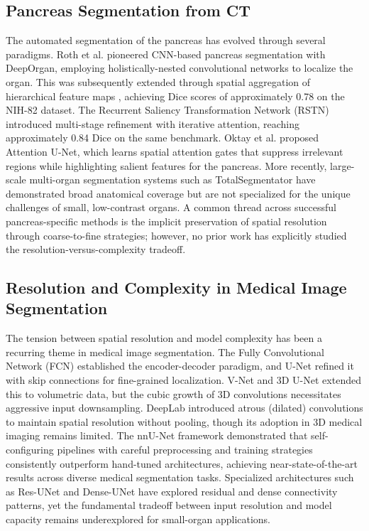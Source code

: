 \documentclass[review,authoryear]{elsarticle}
\begin{document}
\subsection{Pancreas Segmentation from CT}
The automated segmentation of the pancreas has evolved through several paradigms. Roth et al. \cite{nih} pioneered CNN-based pancreas segmentation with DeepOrgan, employing holistically-nested convolutional networks to localize the organ. This was subsequently extended through spatial aggregation of hierarchical feature maps \cite{pancreas_ct}, achieving Dice scores of approximately 0.78 on the NIH-82 dataset. The Recurrent Saliency Transformation Network (RSTN) \cite{rstn} introduced multi-stage refinement with iterative attention, reaching approximately 0.84 Dice on the same benchmark. Oktay et al. \cite{attunet} proposed Attention U-Net, which learns spatial attention gates that suppress irrelevant regions while highlighting salient features for the pancreas. More recently, large-scale multi-organ segmentation systems such as TotalSegmentator \cite{totalseg} have demonstrated broad anatomical coverage but are not specialized for the unique challenges of small, low-contrast organs. A common thread across successful pancreas-specific methods is the implicit preservation of spatial resolution through coarse-to-fine strategies; however, no prior work has explicitly studied the resolution-versus-complexity tradeoff.

\subsection{Resolution and Complexity in Medical Image Segmentation}
The tension between spatial resolution and model complexity has been a recurring theme in medical image segmentation. The Fully Convolutional Network (FCN) \cite{long2015fully} established the encoder-decoder paradigm, and U-Net \cite{unet} refined it with skip connections for fine-grained localization. V-Net \cite{vnet} and 3D U-Net \cite{cciccek20163d} extended this to volumetric data, but the cubic growth of 3D convolutions necessitates aggressive input downsampling. DeepLab \cite{deeplab} introduced atrous (dilated) convolutions to maintain spatial resolution without pooling, though its adoption in 3D medical imaging remains limited. The nnU-Net framework \cite{nnunet} demonstrated that self-configuring pipelines with careful preprocessing and training strategies consistently outperform hand-tuned architectures, achieving near-state-of-the-art results across diverse medical segmentation tasks. Specialized architectures such as Res-UNet \cite{resunet} and Dense-UNet \cite{denseunet} have explored residual and dense connectivity patterns, yet the fundamental tradeoff between input resolution and model capacity remains underexplored for small-organ applications.
\end{document}
